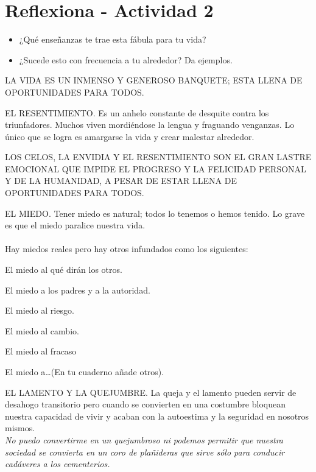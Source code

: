 \documentclass[10pt,twoside]{article}
\begin{document}
\section*{Reflexiona - Actividad 2}
\begin{itemize}
  \item ¿Qué enseñanzas te trae esta fábula para tu vida?
  \item ¿Sucede esto con frecuencia a tu alrededor? Da ejemplos.
\end{itemize}
  \begin{center}
  LA VIDA ES UN INMENSO Y GENEROSO BANQUETE;
ESTA LLENA DE OPORTUNIDADES PARA TODOS.
  \end{center}
EL RESENTIMIENTO. Es un anhelo constante de desquite contra los triunfadores. Muchos viven mordiéndose la lengua y fraguando venganzas. Lo único que se logra es amargarse la vida y crear malestar alrededor.
\begin{center}
LOS CELOS, LA ENVIDIA Y EL RESENTIMIENTO SON
EL GRAN LASTRE EMOCIONAL QUE IMPIDE EL
PROGRESO Y LA FELICIDAD PERSONAL Y DE LA
HUMANIDAD, A PESAR DE ESTAR LLENA
DE OPORTUNIDADES PARA TODOS.
\end{center}
EL MIEDO. Tener miedo es natural; todos lo tenemos o hemos tenido. Lo grave es que el miedo paralice nuestra vida.\\\\
Hay miedos reales pero hay otros infundados como los siguientes:
\begin{itemize}\begin{multicols}{2}
  \item El miedo al qué dirán los otros.
  \item El miedo a los padres y a la autoridad.
  \item El miedo al riesgo.
  \item El miedo al cambio.
  \item El miedo al fracaso
  \item El miedo a\ldots (En tu cuaderno añade otros).  
\end{multicols}
\end{itemize}
EL LAMENTO Y LA QUEJUMBRE. La queja y el lamento pueden servir de desahogo transitorio pero cuando se convierten en una costumbre bloquean nuestra capacidad de vivir y acaban con la autoestima y la seguridad en nosotros mismos.\\
\emph{No puedo convertirme en un quejumbroso ni podemos permitir que nuestra sociedad se convierta en un coro de plañideras que sirve sólo para conducir cadáveres a los cementerios.}
\end{document}
